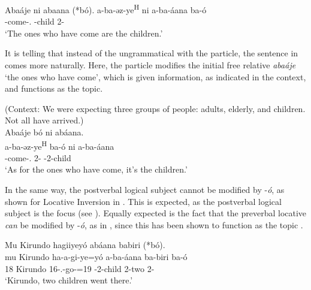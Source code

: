 \documentclass[output=paper]{langscibook}
\begin{document}
\ea
\label{bkm:Ref75175946}
Abaáje ni abaana (*bó).  \jambox*{[pseudocleft]}
\gll
a-ba-əz-ye\textsuperscript{H}  ni  a-ba-áana  ba-ó\\
\SM-{}come-\PFV.\REL{}  \COP{}  -child  2-\CM{}\\
\glt
‘The ones who have come are the children.’\\

\z

It is telling that instead of the ungrammatical  with the particle, the sentence in  comes more naturally. Here, the particle modifies the initial free relative \textit{abaáje} ‘the ones who have come’, which is given information, as indicated in the context, and functions as the topic.

\ea
\label{bkm:Ref81816342}
\label{bkm:Ref75176045}(Context: We were expecting three groups of people: adults, elderly, and children. Not all have arrived.)\\
Abaáje bó ni abáana.\\
\gll
a-ba-əz-ye\textsuperscript{H}  ba-ó  ni  a-ba-áana\\
\SM-{}come-\PFV.\REL{}  2-\CM{}  \COP{}  \AUG{}-2-child\\
\glt
‘As for the ones who have come, it’s the children.’\\

\z

In the same way, the postverbal logical subject cannot be modified by -\textit{ó}, as shown for Locative Inversion in . This is expected, as the postverbal logical subject is the focus (see ). Equally expected is the fact that the preverbal locative \textit{can} be modified by -\textit{ó}, as in , since this has been shown to function as the topic \citep[62]{Nshemezimana2020}.

\ea
\label{bkm:Ref75179471}
Mu Kirundo hagiiyeyó abáana babiri (*bó).\\
\gll
mu  Kirundo  ha-a-gi-ye=yó  a-ba-áana  ba-biri  ba-ó\\
18  Kirundo  16\SM{}-\N.\PST{}-go-\PFV{}=19  \AUG{}-2-child  2-two  2-\CM{}\\
\glt
‘Kirundo, two children went there.’\\
\end{document}
